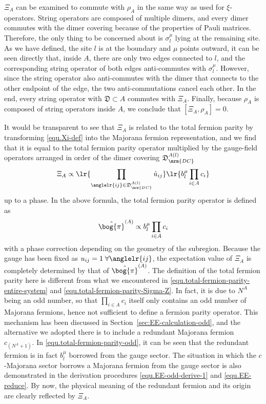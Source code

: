 $\Xi_A$ can be examined to commute with $\rho_A$ in the same way as used for $\xi$-operators. String operators are composed of multiple dimers, and every dimer commutes with the dimer covering because of the properties of Pauli matrices. Therefore, the only thing to be concerned about is $\sigma^\mu_l$ lying at the remaining site.
As we have defined, the site $l$ is at the boundary and $\mu$ points outward, it can be seen directly that, inside $A$, there are only two edges connected to $l$, and the corresponding string operator of both edges anti-commutes with $\sigma^\mu_l$. However, since the string operator also anti-commutes with the dimer that connects to the other endpoint of the edge, the two anti-commutations cancel each other. In the end, every string operator with $\mathfrak{D}\subset A$ commutes with $\Xi_A$. Finally, because $\rho_A$ is composed of string operators inside $A$, we conclude that $[\Xi_A,\rho_A]=0$. 

It would be transparent to see that $\Xi_A$ is related to the total fermion parity by transforming \eqref{equ.Xi-def} into the Majorana fermion representation, and we find that it is equal to the total fermion parity operator multiplied by the gauge-field operators arranged in order of the dimer covering $\mathfrak{D}^{A(l)}_{\mrm{DC}}$
\[
\Xi_A \propto \lr{\prod_{\anglelr{ij}\in  \mathfrak{D}^{A(l)}_{\mrm{DC}}} \hat{u}_{ij}} \lr{b^\mu_l\prod_{i\in A}c_i}
\]
up to a phase. In the above formula, the total fermion parity operator is defined as
\begin{equation}\label{equ.total-fermion-parity-odd}
    \hat{\bog{\pi}}^{(A)} \propto b^\mu_l\prod_{i\in A}c_i
\end{equation}
with a phase correction depending on the geometry of the subregion. Because the gauge has been fixed as $u_{ij}=1\;\forall\anglelr{ij}$, the expectation value of $\Xi_A$ is completely determined by that of $\hat{\bog{\pi}}^{(A)}$. The definition of the total fermion parity here is different from what we encountered in \eqref{equ.total-fermion-parity-entire-system} and \eqref{equ.total-fermion-parity-Sigma-Z}. In fact, it is due to $N^A$ being an odd number, so that $\prod_{i\in A}c_i$ itself only contains an odd number of Majorana fermions, hence not sufficient to define a fermion parity operator. This mechanism has been discussed in Section~\ref{sec:EE-calculation-odd}, and the alternative we adopted there is to include a redundant Majorana fermion $c_{(N^A+1)}$. In \eqref{equ.total-fermion-parity-odd}, it can be seen that the redundant fermion is in fact $b^\mu_l$ borrowed from the gauge sector. The situation in which the $c$-Majorana sector borrows a Majorana fermion from the gauge sector is also demonstrated in the derivation procedures \eqref{equ.EE-odd-derive-1} and \eqref{equ.EE-reduce}. By now, the physical meaning of the redundant fermion and its origin are clearly reflected by $\Xi_A$. 

